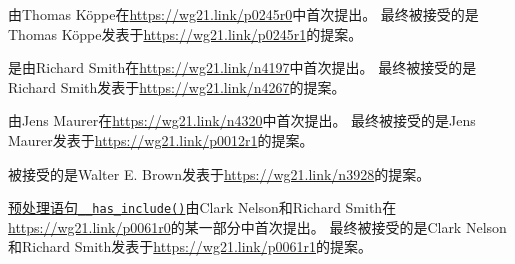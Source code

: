 由Thomas Köppe在\url{https://wg21.link/p0245r0}中首次提出。
最终被接受的是Thomas Köppe发表于\url{https://wg21.link/p0245r1}的提案。

是由Richard Smith在\url{https://wg21.link/n4197}中首次提出。
最终被接受的是Richard Smith发表于\url{https://wg21.link/n4267}的提案。

由Jens Maurer在\url{https://wg21.link/n4320}中首次提出。
最终被接受的是Jens Maurer发表于\url{https://wg21.link/p0012r1}的提案。

被接受的是Walter E. Brown发表于\url{https://wg21.link/n3928}的提案。

\hyperref[ch8.9]{预处理语句\texttt{\_\_has\_include()}}由Clark Nelson和Richard Smith在
\url{https://wg21.link/p0061r0}的某一部分中首次提出。
最终被接受的是Clark Nelson和Richard Smith发表于\url{https://wg21.link/p0061r1}的提案。